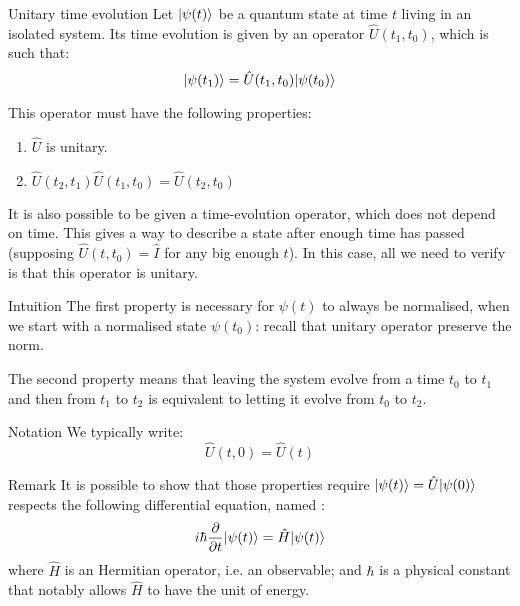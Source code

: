 \documentclass[a4paper]{article}
\begin{document}
\begin{parag}{Unitary time evolution}
    Let $\ket{\psi\left(t\right)}$ be a quantum state at time $t$ living in an isolated system. Its time evolution is given by an operator $\hat{U}\left(t_1, t_0\right)$, which is such that: 
    \[\ket{\psi\left(t_1\right)} = \hat{U}\left(t_1, t_0\right)\ket{\psi\left(t_0\right)}\]

    This operator must have the following properties:
    \begin{enumerate}
        \item $\hat{U}$ is unitary.
        \item $\hat{U}\left(t_2, t_1\right) \hat{U}\left(t_1, t_0\right) = \hat{U}\left(t_2, t_0\right)$
    \end{enumerate}

    It is also possible to be given a time-evolution operator, which does not depend on time. This gives a way to describe a state after enough time has passed (supposing $\hat{U}\left(t, t_0\right) = \hat{I}$ for any big enough $t$). In this case, all we need to verify is that this operator is unitary.

    \begin{subparag}{Intuition}
        The first property is necessary for $\psi\left(t\right)$ to always be normalised, when we start with a normalised state $\psi\left(t_0\right)$: recall that unitary operator preserve the norm.

        The second property means that leaving the system evolve from a time $t_0$ to $t_1$ and then from $t_1$ to $t_2$ is equivalent to letting it evolve from $t_0$ to $t_2$.
    \end{subparag}

    \begin{subparag}{Notation}
        We typically write: 
        \[\hat{U}\left(t, 0\right) = \hat{U}\left(t\right)\]
    \end{subparag}

    \begin{subparag}{Remark}
        It is possible to show that those properties require $\ket{\psi\left(t\right)} = \hat{U}\ket{\psi\left(0\right)}$ respects the following differential equation, named : 
        \[i \hbar \frac{\partial}{\partial t} \ket{\psi\left(t\right)} = \hat{H} \ket{\psi\left(t\right)}\]
        where $\hat{H}$ is an Hermitian operator, i.e. an observable; and $\hbar$ is a physical constant that notably allows $\hat{H}$ to have the unit of energy.


\end{subparag}
\end{parag}
\end{document}
